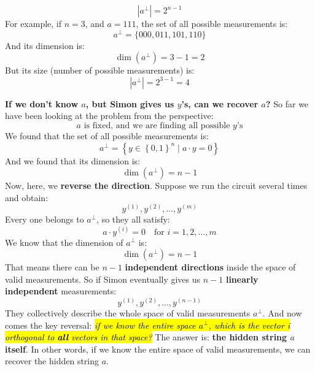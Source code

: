 \begin{equation}
    \left|a^{\perp}\right| = 2^{n-1}
\end{equation}
For example, if $n=3$, and $a = 111$, the set of all possible measurements is:
\begin{equation*}
    a^{\perp} = \{000, 011, 101, 110\}
\end{equation*}
And its dimension is:
\begin{equation*}
    \dim\left(a^{\perp}\right) = 3 - 1 = 2
\end{equation*}
But its size (number of possible measurements) is:
\begin{equation*}
    \left|a^{\perp}\right| = 2^{3-1} = 4
\end{equation*}

\highspace
\textcolor{Green3}{ \textbf{If we don't know $a$, but Simon gives us $y$'s, can we recover $a$?}} So far we have been looking at the problem from the perspective:
\begin{equation*}
    a \text{ is fixed, and we are finding all possible } y \text{'s}
\end{equation*}
We found that the set of all possible measurements is:
\begin{equation*}
    a^{\perp} = \left\{
        y \in \left\{0,1\right\}^{n} \mid a \cdot y = 0
    \right\}
\end{equation*}
And we found that its dimension is:
\begin{equation*}
    \dim\left(a^{\perp}\right) = n - 1
\end{equation*}
Now, here, we \textbf{reverse the direction}. Suppose we run the circuit several times and obtain:
\begin{equation*}
    y^{(1)}, y^{(2)}, \ldots, y^{(m)}
\end{equation*}
Every one belongs to $a^{\perp}$, so they all satisfy:
\begin{equation*}
    a \cdot y^{(i)} = 0 \quad \text{for } i = 1, 2, \ldots, m
\end{equation*}
We know that the dimension of $a^{\perp}$ is:
\begin{equation*}
    \dim\left(a^{\perp}\right) = n - 1
\end{equation*}
That means there can be $n-1$ \textbf{independent directions} inside the space of valid measurements. So if Simon eventually gives us $n-1$ \textbf{linearly independent} measurements:
\begin{equation*}
    y^{(1)}, y^{(2)}, \ldots, y^{(n-1)}
\end{equation*}
They collectively describe the whole space of valid measurements $a^{\perp}$. And now comes the key reversal: \hl{\emph{if we know the entire space $a^{\perp}$, which is the vector i orthogonal to \textbf{all} vectors in that space?}} The answer is: \textbf{the hidden string $a$ itself}. In other words, if we know the entire space of valid measurements, we can recover the hidden string $a$.

